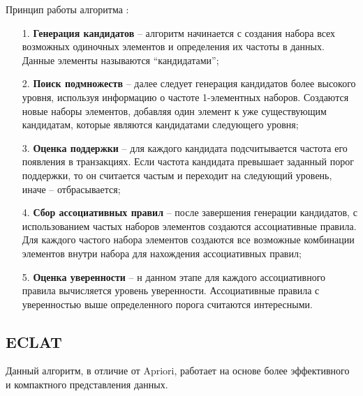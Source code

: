 Принцип работы алгоритма \cite{sr1}:
\begin{enumerate}
	\item[1.] \textbf{Генерация кандидатов} -- алгоритм начинается с создания набора всех возможных одиночных элементов и определения их частоты в данных. Данные элементы называются ``кандидатами'';
	\item[2.] \textbf{Поиск подмножеств} -- далее следует генерация кандидатов более высокого уровня, используя информацию о частоте 1-элементных наборов. Создаются новые наборы элементов, добавляя один элемент к уже существующим кандидатам, которые являются кандидатами следующего уровня;
	\item[3.] \textbf{Оценка поддержки} -- для каждого кандидата подсчитывается частота его появления в транзакциях. Если частота кандидата превышает заданный порог поддержки, то он считается частым и переходит на следующий уровень, иначе -- отбрасывается;
	\item[4.] \textbf{Сбор ассоциативных правил} -- после завершения генерации кандидатов, с использованием частых наборов элементов создаются ассоциативные правила. Для каждого частого набора элементов создаются все возможные комбинации элементов внутри набора для нахождения ассоциативных правил;
	\item[5.] \textbf{Оценка уверенности} -- н данном этапе для каждого ассоциативного правила вычисляется уровень уверенности. Ассоциативные правила с уверенностью выше определенного порога считаются интересными.
\end{enumerate}

\subsection{ECLAT}

Данный алгоритм, в отличие от Apriori, работает на основе более эффективного и компактного представления данных.

